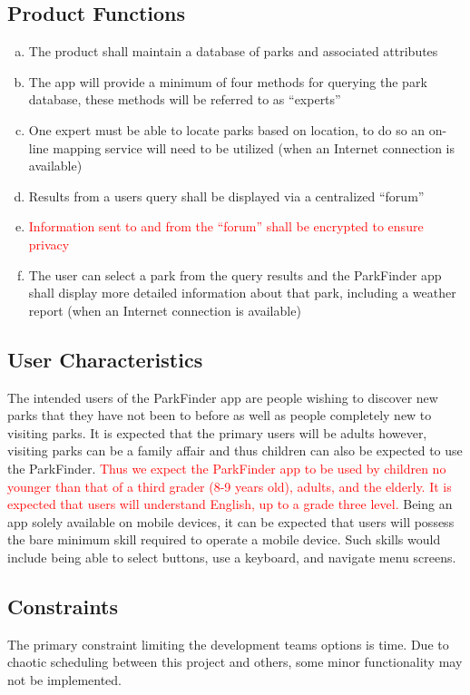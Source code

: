 \documentclass[titlepage]{article}
\begin{document}
\subsection{Product Functions}
\label{sub:product_functions}
\begin{enumerate}[a)]
	\item The product shall maintain a database of parks and associated attributes
    \item The app will provide a minimum of four methods for querying the park database, these
    methods	will be referred to as ``experts''
    \item One expert must be able to locate parks based on location, to do so
    an on-line mapping service will need to be utilized (when an Internet connection is available)
    \item Results from a users query shall be displayed via a centralized ``forum''
    \item \textcolor{red}{Information sent to and from the ``forum'' shall be encrypted to ensure
    privacy}
    \item The user can select a park from the query results and the ParkFinder app shall display
    more detailed information about that park, including a weather report (when an Internet
    connection is available)
\end{enumerate}

\subsection{User Characteristics}
\label{sub:user_characteristics}
The intended users of the ParkFinder app are people wishing to discover new parks that they have not
been to before as well as people completely new to visiting parks. It is expected that the primary
users will be adults however, visiting parks can be a family affair and thus children can also
be expected to use the ParkFinder. \textcolor{red}{Thus we expect the ParkFinder app to be used
by children no younger than that of a third grader (8-9 years old), adults, and the elderly. It is
expected that users will understand English, up to a grade three level.} Being an app solely
available on mobile devices, it can be expected that users will possess the bare minimum skill
required to operate a mobile device. Such skills would include being able to select buttons, use a
keyboard, and navigate menu screens.

\subsection{Constraints}
\label{sub:constraints}
The primary constraint limiting the development teams options is time. Due to chaotic scheduling
between this project and others, some minor functionality may not be implemented.
\end{document}
